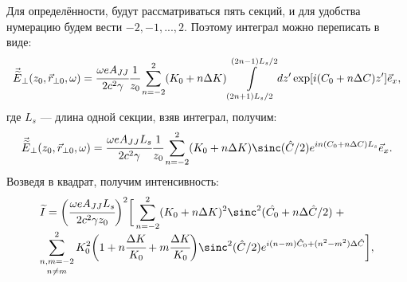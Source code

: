 Для определённости, будут рассматриваться пять секций, и для удобства нумерацию будем вести $-2, -1, ... , 2$. Поэтому интеграл можно переписать в виде:
\begin{equation}
\begin{array}{lcl}
\vec{\widetilde{E}}_{\bot}(z_0,  \vec{r}_{\bot 0}, \omega) =
\cfrac{\omega eA_{JJ}}{2c^2 \gamma}\cfrac{1}{z_0}
\displaystyle\sum\limits_{n =-2}^{2}(K_0 + n\Delta K)
\displaystyle\int\limits_{(2n + 1)L_s/2}^{(2n - 1)L_s/2} dz'
\exp[i(C_0 + n\Delta C)z']	\vec{e}_x,
\end{array}	
\end{equation} 
где $L_s$ --- длина одной секции, взяв интеграл, получим:
\begin{equation}
\begin{array}{lcl}
\vec{\widetilde{E}}_{\bot}(z_0,  \vec{r}_{\bot 0}, \omega) =
\cfrac{\omega eA_{JJ} L_s}{2c^2 \gamma}\cfrac{1}{z_0}
\displaystyle\sum\limits_{n =-2}^{2}(K_0 + n\Delta K)
\sinc(\hat{C}/2)e^{in({C}_0 + n\Delta {C})L_s}	\vec{e}_x.
\end{array}	
\end{equation} 
Возведя в квадрат, получим интенсивность:
\begin{equation}
\begin{array}{lcl}
{\widetilde{I}} =
\bigg(\cfrac{\omega eA_{JJ} L_s}{2c^2 \gamma z_0}\bigg)^2\bigg[
\displaystyle\sum\limits_{n =-2}^{2}(K_0 + n\Delta K)^2\sinc^2(\hat{C_0} + n\Delta \hat{C}/2) \; + \\

\displaystyle\mathop{\sum\limits_{n, m =-2}^{2}}_{n \neq m}K^2_0\bigg(1 + n\cfrac{\Delta K}{K_0} + m\cfrac{\Delta K}{K_0}\bigg)
\sinc^2(\hat{C}/2)e^{i(n-m)\hat{C}_0 + (n^2 - m^2)\Delta \hat{C}}\bigg],
\end{array}	
\end{equation} 
